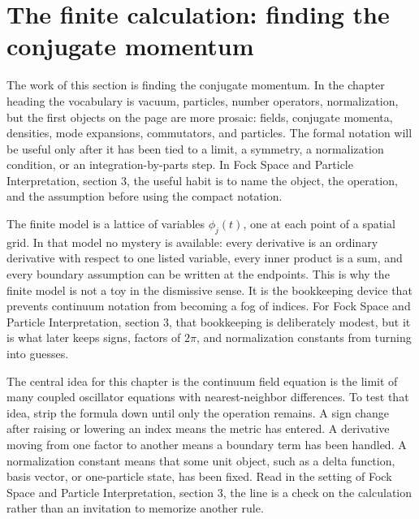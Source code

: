\section{The finite calculation: finding the conjugate momentum}













The work of this section is finding the conjugate momentum.  In the chapter heading the vocabulary is vacuum, particles, number operators, normalization, but the first objects on the page are more prosaic: fields, conjugate momenta, densities, mode expansions, commutators, and particles.  The formal notation will be useful only after it has been tied to a limit, a symmetry, a normalization condition, or an integration-by-parts step.  In Fock Space and Particle Interpretation, section 3, the useful habit is to name the object, the operation, and the assumption before using the compact notation.

The finite model is a lattice of variables \(\phi_j(t)\), one at each point of a spatial grid.  In that model no mystery is available: every derivative is an ordinary derivative with respect to one listed variable, every inner product is a sum, and every boundary assumption can be written at the endpoints.  This is why the finite model is not a toy in the dismissive sense.  It is the bookkeeping device that prevents continuum notation from becoming a fog of indices.  For Fock Space and Particle Interpretation, section 3, that bookkeeping is deliberately modest, but it is what later keeps signs, factors of \(2\pi\), and normalization constants from turning into guesses.

The central idea for this chapter is the continuum field equation is the limit of many coupled oscillator equations with nearest-neighbor differences.  To test that idea, strip the formula down until only the operation remains.  A sign change after raising or lowering an index means the metric has entered.  A derivative moving from one factor to another means a boundary term has been handled.  A normalization constant means that some unit object, such as a delta function, basis vector, or one-particle state, has been fixed.  Read in the setting of Fock Space and Particle Interpretation, section 3, the line is a check on the calculation rather than an invitation to memorize another rule.

